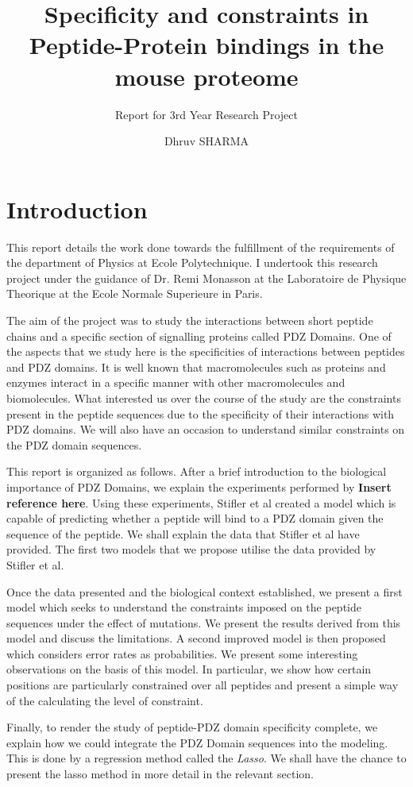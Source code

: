 \documentclass[a4paper, 12pt]{article}
\title{Specificity and constraints in Peptide-Protein bindings in the mouse proteome}
\subtitle{Report for 3rd Year Research Project}
\author{Dhruv SHARMA}
\begin{document}
\pagebreak
\maketitle
\tableofcontents
\pagebreak
\part{Introduction}
	This report details the work done towards the fulfillment of the requirements of the department of Physics at Ecole Polytechnique. I undertook this research project under the guidance of Dr. Remi Monasson at the Laboratoire de Physique Theorique at the Ecole Normale Superieure in Paris.

	\indent
	The aim of the project was to study the interactions between short peptide chains and a specific section of signalling proteins called PDZ Domains. One of the aspects that we study here is the specificities of interactions between peptides and PDZ domains. It is well known that macromolecules such as proteins and enzymes interact in a specific manner with other macromolecules and biomolecules. What interested us over the course of the study are the constraints present in the peptide sequences due to the specificity of their interactions with PDZ domains. We will also have an occasion to understand similar constraints on the PDZ domain sequences. 

	This report is organized as follows. After a brief introduction to the biological importance of PDZ Domains, we explain the experiments performed by \textbf{Insert reference here}. Using these experiments, Stifler et al created a model which is capable of predicting whether a peptide will bind to a PDZ domain given the sequence of the peptide. We shall explain the data that Stifler et al have provided. The first two models that we propose utilise the data provided by Stifler et al. 

	Once the data presented and the biological context established, we present a first model which seeks to understand the constraints imposed on the peptide sequences under the effect of mutations. We present the results derived from this model and discuss the limitations. A second improved model is then proposed which considers error rates as probabilities. We present some interesting observations on the basis of this model. In particular, we show how certain positions are particularly constrained over all peptides and present a simple way of the calculating the level of constraint. 

	Finally, to render the study of peptide-PDZ domain specificity complete, we explain how we could integrate the PDZ Domain sequences into the modeling. This is done by a regression method called the \textit{Lasso}. We shall have the chance to present the lasso method in more detail in the relevant section. 
\end{document}
